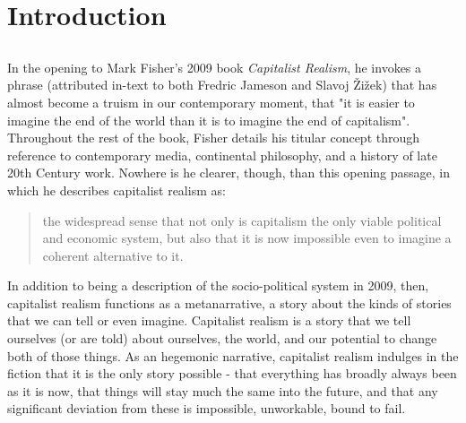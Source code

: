\chapter{Introduction}
\label{ch:1}

\section{}
\label{sec:}

In the opening to Mark Fisher's 2009 book \emph{Capitalist Realism}, he invokes a phrase (attributed in-text to both Fredric Jameson and Slavoj Žižek) that has almost become a truism in our contemporary moment, that "it is easier to imagine the end of the world than it is to imagine the end of capitalism". Throughout the rest of the book, Fisher details his titular concept through reference to contemporary media, continental philosophy, and a history of late 20th Century work. Nowhere is he clearer, though, than this opening passage, in which he describes capitalist realism as:

\begin{quote}
    the widespread sense that not only is capitalism the only viable political and economic system, but also that it is now impossible even to imagine a coherent alternative to it. \citep{fisher_capitalist_2009}
\end{quote}

In addition to being a description of the socio-political system in 2009, then, capitalist realism functions as a metanarrative, a story about the kinds of stories that we can tell or even imagine. Capitalist realism is a story that we tell ourselves (or are told) about ourselves, the world, and our potential to change both of those things. As an hegemonic narrative, capitalist realism indulges in the fiction that it is the only story possible - that everything has broadly always been as it is now, that things will stay much the same into the future, and that any significant deviation from these is impossible, unworkable, bound to fail. 

